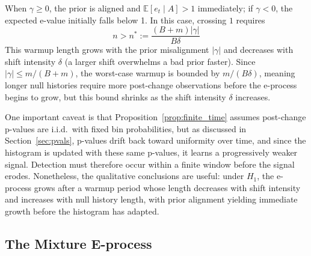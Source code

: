 \documentclass[ejsv2, noshowframe]{imsart}
\theoremstyle{plain}
\theoremstyle{definition}
\theoremstyle{remark}
\newcommand{\E}{\mathbb{E}}
\begin{document}
When $\gamma \ge 0$, the prior is aligned and $\E[e_t\mid A]>1$ immediately; if $\gamma<0$, the expected e-value initially falls below 1. In this case, crossing $1$ requires
\begin{equation}
 n > n^* := \frac{(B+m)|\gamma|}{B\delta}
\end{equation}
This warmup length grows with the prior misalignment $|\gamma|$ and decreases with shift intensity $\delta$ (a larger shift overwhelms a bad prior faster). Since $|\gamma|\le m/(B+m)$, the worst-case warmup is bounded by $m/(B\delta)$, meaning longer null histories require more post-change observations before the e-process begins to grow, but this bound shrinks as the shift intensity $\delta$ increases.

\noindent One important caveat is that Proposition~\ref{prop:finite_time} assumes post-change p-values are i.i.d.\ with fixed bin probabilities, but as discussed in Section~\ref{sec:pvals}, p-values drift back toward uniformity over time, and since the histogram is updated with these same p-values, it learns a progressively weaker signal. Detection must therefore occur within a finite window before the signal erodes. Nonetheless, the qualitative conclusions are useful: under $H_1$, the e-process grows after a warmup period whose length decreases with shift intensity and increases with null history length, with prior alignment yielding immediate growth before the histogram has adapted.

\subsection{The Mixture E-process}
\label{sec:method_mixture}
\end{document}
